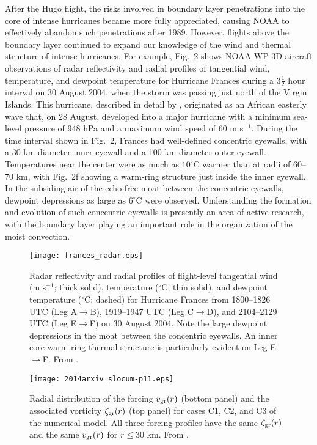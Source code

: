 \documentclass[10pt]{article}
\begin{document}
     After the Hugo flight, the risks involved in boundary layer penetrations
into the core of intense hurricanes became more fully appreciated, causing NOAA
to effectively abandon such penetrations after 1989. However, flights above
the boundary layer continued to expand our knowledge of the wind and thermal
structure of intense hurricanes. For example, Fig.~2 shows NOAA WP-3D aircraft
observations of radar reflectivity and radial profiles of tangential wind,
temperature, and dewpoint temperature for Hurricane Frances during a
$3\frac{1}{2}$ hour interval on 30 August 2004, when the storm was
passing just north of the Virgin Islands. This hurricane, described in detail
by \citet{rozoff08}, originated as an African easterly wave that, on 28 August,
developed into a major hurricane with a minimum sea-level pressure of 948 hPa and
a maximum wind speed of 60 m s$^{-1}$. During the time interval shown in
Fig.~2, Frances had well-defined concentric eyewalls, with a 30 km diameter
inner eyewall and a 100 km diameter
outer eyewall. Temperatures near the center were as much as $10^\circ$C warmer
than at  radii of 60--70 km, with Fig.~2f showing a warm-ring structure just
inside the inner eyewall.  In the subsiding air of the echo-free moat between the
concentric eyewalls, dewpoint depressions as large as $6^\circ$C were observed.
Understanding the formation and evolution of such concentric eyewalls is presently
an area of active research, with the boundary layer playing an important role
in the organization of the moist convection.



\begin{figure*}[!th]                                  %
\centerline{\texttt{[image: frances\_radar.eps]}}
\caption{Radar reflectivity and radial profiles of flight-level tangential
wind (m s$^{-1}$; thick solid), temperature ($^\circ$C; thin solid), and dewpoint
temperature ($^\circ$C; dashed) for Hurricane Frances from
1800--1826 UTC (Leg A$\to$B), 1919--1947 UTC (Leg C$\to$D), and
2104--2129 UTC (Leg E$\to$F) on 30 August 2004. Note the large dewpoint
depressions in the moat between the concentric eyewalls. An inner core warm ring
thermal structure is particularly evident on Leg E$\to$F. From \citet{rozoff08}.}
\end{figure*}


\begin{figure}[t]                         %
\centerline{\texttt{[image: 2014arxiv\_slocum-p11.eps]}}
\caption{Radial distribution of the forcing $v_{\rm gr}(r)$ (bottom panel)
and the associated vorticity $\zeta_{\rm gr}(r)$ (top panel) for cases C1, C2,
and C3 of the numerical model. All three forcing profiles have the same
$\zeta_{\rm gr}(r)$ and the same $v_{\rm gr}(r)$ for $r \le 30$ km. From \citet{slocum14}.}
\end{figure}
\end{document}
